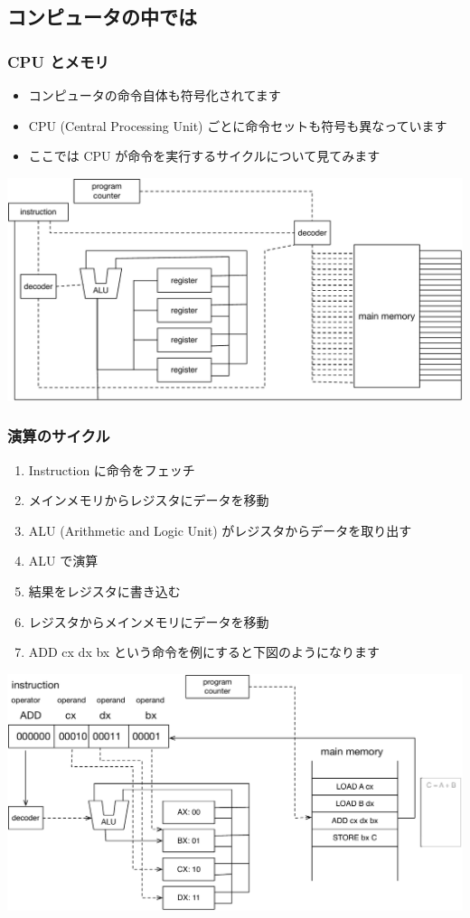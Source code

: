 \subsection{コンピュータの中では}
\begin{frame}[shrink]
\frametitle{CPU とメモリ}
  \begin{itemize}
\item コンピュータの命令自体も符号化されてます
\item CPU (Central Processing Unit) ごとに命令セットも符号も異なっています
\item ここでは CPU が命令を実行するサイクルについて見てみます
  \end{itemize}
  \begin{center}
\includegraphics[scale=0.3]{./Figure/elementaryCS-figCPU}
  \end{center}
\end{frame}
\begin{frame}[shrink]
\frametitle{演算のサイクル}
  \begin{enumerate}
\scriptsize
\item Instruction に命令をフェッチ
\item メインメモリからレジスタにデータを移動
\item ALU (Arithmetic and Logic Unit) がレジスタからデータを取り出す
\item ALU で演算
\item 結果をレジスタに書き込む
\item レジスタからメインメモリにデータを移動
\item ADD cx dx bx という命令を例にすると下図のようになります
  \end{enumerate}
  \begin{center}
\includegraphics[scale=0.3]{./Figure/elementaryCS-figCycle}
  \end{center}
\end{frame}
